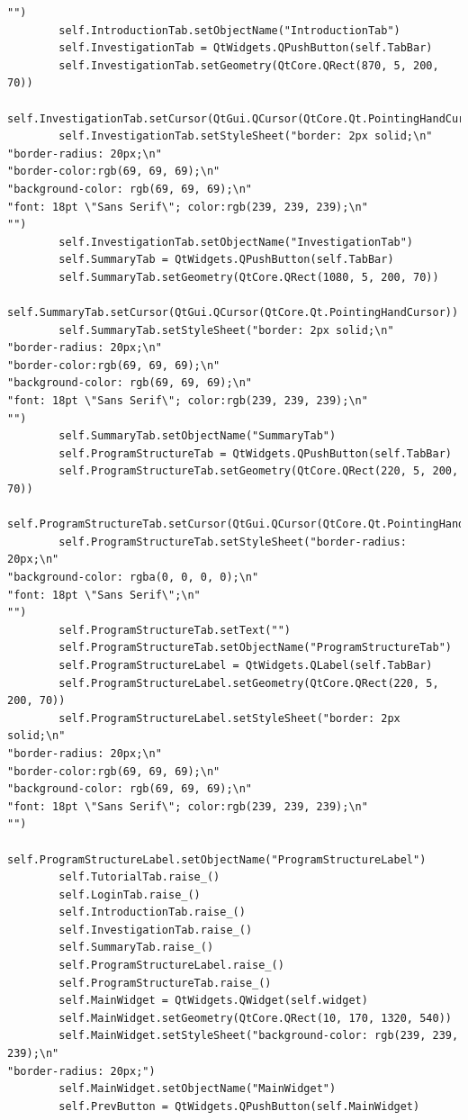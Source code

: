 \documentclass{article}
\begin{document}
\begin{lstlisting}
"")
        self.IntroductionTab.setObjectName("IntroductionTab")
        self.InvestigationTab = QtWidgets.QPushButton(self.TabBar)
        self.InvestigationTab.setGeometry(QtCore.QRect(870, 5, 200, 70))
        self.InvestigationTab.setCursor(QtGui.QCursor(QtCore.Qt.PointingHandCursor))
        self.InvestigationTab.setStyleSheet("border: 2px solid;\n"
"border-radius: 20px;\n"
"border-color:rgb(69, 69, 69);\n"
"background-color: rgb(69, 69, 69);\n"
"font: 18pt \"Sans Serif\"; color:rgb(239, 239, 239);\n"
"")
        self.InvestigationTab.setObjectName("InvestigationTab")
        self.SummaryTab = QtWidgets.QPushButton(self.TabBar)
        self.SummaryTab.setGeometry(QtCore.QRect(1080, 5, 200, 70))
        self.SummaryTab.setCursor(QtGui.QCursor(QtCore.Qt.PointingHandCursor))
        self.SummaryTab.setStyleSheet("border: 2px solid;\n"
"border-radius: 20px;\n"
"border-color:rgb(69, 69, 69);\n"
"background-color: rgb(69, 69, 69);\n"
"font: 18pt \"Sans Serif\"; color:rgb(239, 239, 239);\n"
"")
        self.SummaryTab.setObjectName("SummaryTab")
        self.ProgramStructureTab = QtWidgets.QPushButton(self.TabBar)
        self.ProgramStructureTab.setGeometry(QtCore.QRect(220, 5, 200, 70))
        self.ProgramStructureTab.setCursor(QtGui.QCursor(QtCore.Qt.PointingHandCursor))
        self.ProgramStructureTab.setStyleSheet("border-radius: 20px;\n"
"background-color: rgba(0, 0, 0, 0);\n"
"font: 18pt \"Sans Serif\";\n"
"")
        self.ProgramStructureTab.setText("")
        self.ProgramStructureTab.setObjectName("ProgramStructureTab")
        self.ProgramStructureLabel = QtWidgets.QLabel(self.TabBar)
        self.ProgramStructureLabel.setGeometry(QtCore.QRect(220, 5, 200, 70))
        self.ProgramStructureLabel.setStyleSheet("border: 2px solid;\n"
"border-radius: 20px;\n"
"border-color:rgb(69, 69, 69);\n"
"background-color: rgb(69, 69, 69);\n"
"font: 18pt \"Sans Serif\"; color:rgb(239, 239, 239);\n"
"")
        self.ProgramStructureLabel.setObjectName("ProgramStructureLabel")
        self.TutorialTab.raise_()
        self.LoginTab.raise_()
        self.IntroductionTab.raise_()
        self.InvestigationTab.raise_()
        self.SummaryTab.raise_()
        self.ProgramStructureLabel.raise_()
        self.ProgramStructureTab.raise_()
        self.MainWidget = QtWidgets.QWidget(self.widget)
        self.MainWidget.setGeometry(QtCore.QRect(10, 170, 1320, 540))
        self.MainWidget.setStyleSheet("background-color: rgb(239, 239, 239);\n"
"border-radius: 20px;")
        self.MainWidget.setObjectName("MainWidget")
        self.PrevButton = QtWidgets.QPushButton(self.MainWidget)

\end{lstlisting}
\end{document}
